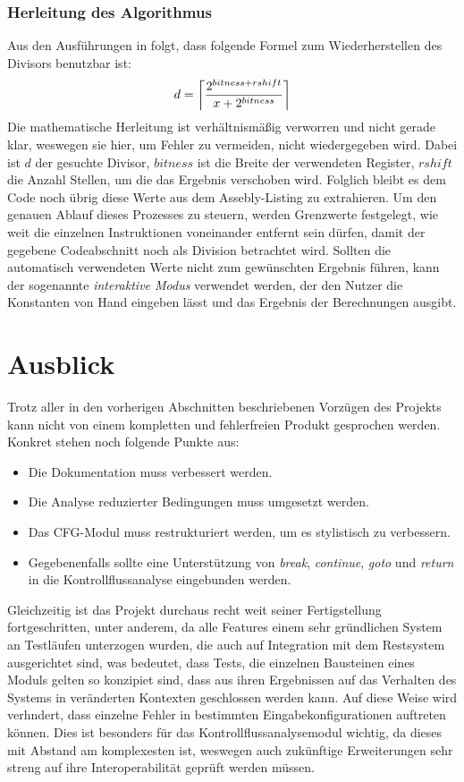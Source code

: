 \documentclass[11pt]{article} %
\DeclarePairedDelimiter\ceil{\lceil}{\rceil}
\begin{document}
\subsubsection{Herleitung des Algorithmus}
Aus den Ausführungen in \cite{stackexchange:4} folgt, dass folgende Formel zum Wiederherstellen
des Divisors benutzbar ist:
\begin{equation*}
	d = \ceil*{\frac{2^{bitness + rshift}}{x + 2^{bitness}}}
\end{equation*}
Die mathematische Herleitung ist verhältnismäßig verworren und nicht gerade klar, weswegen sie hier,
um Fehler zu vermeiden, nicht wiedergegeben wird. Dabei ist $d$ der gesuchte Divisor, $bitness$ ist
die Breite der verwendeten Register, $rshift$ die Anzahl Stellen, um die das Ergebnis verschoben wird.
Folglich bleibt es dem Code noch übrig diese Werte aus dem Assebly-Listing zu extrahieren. Um den
genauen Ablauf dieses Prozesses zu steuern, werden Grenzwerte festgelegt, wie weit die einzelnen
Instruktionen voneinander entfernt sein dürfen, damit der gegebene Codeabschnitt noch als Division
betrachtet wird. Sollten die automatisch verwendeten Werte nicht zum gewünschten Ergebnis führen,
kann der sogenannte \textit{interaktive Modus} verwendet werden, der den Nutzer die Konstanten von
Hand eingeben lässt und das Ergebnis der Berechnungen ausgibt. 

\section{Ausblick}
Trotz aller in den vorherigen Abschnitten beschriebenen Vorzügen des Projekts kann nicht von
einem kompletten und fehlerfreien Produkt gesprochen werden. Konkret stehen noch folgende Punkte aus:
\begin{itemize}
	\item{Die Dokumentation muss verbessert werden.}
	\item{Die Analyse reduzierter Bedingungen muss umgesetzt werden.}
	\item{Das CFG-Modul muss restrukturiert werden, um es stylistisch zu verbessern.}
	\item{Gegebenenfalls sollte eine Unterstützung von \textit{break}, \textit{continue},
		\textit{goto} und \textit{return} in die Kontrollflussanalyse eingebunden werden.}
\end{itemize}
Gleichzeitig ist das Projekt durchaus recht weit seiner Fertigstellung fortgeschritten, unter
anderem, da alle Features einem sehr gründlichen System an Testläufen unterzogen wurden, die auch
auf Integration mit dem Restsystem ausgerichtet sind, was bedeutet, dass Tests, die einzelnen
Bausteinen eines Moduls gelten so konzipiet sind, dass aus ihren Ergebnissen auf das Verhalten des
Systems in veränderten Kontexten geschlossen werden kann. Auf diese Weise wird verhndert, dass
einzelne Fehler in bestimmten Eingabekonfigurationen auftreten können. Dies ist besonders für das
Kontrollflussanalysemodul wichtig, da dieses mit Abstand am komplexesten ist, weswegen auch
zukünftige Erweiterungen sehr streng auf ihre Interoperabilität geprüft werden müssen.



\end{document}

